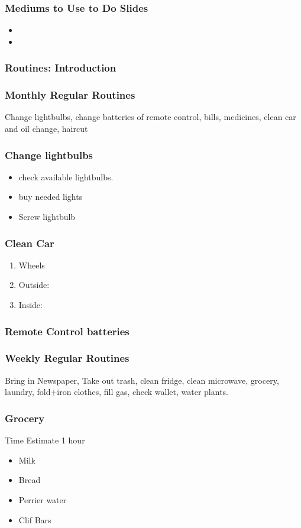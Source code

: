 \begin{frame} 
\frametitle{Mediums to Use to Do Slides}
\begin{itemize} 
\tiny \item \tiny  
\item \tiny 
\end{itemize} 
\end{frame}

\begin{frame}
\frametitle{Routines: Introduction}
\end{frame} 

\begin{frame}
\frametitle{Monthly Regular Routines  } 
{ \small Change lightbulbs, change batteries of remote control, bills,
  medicines, clean car and oil change, haircut}
\end{frame}

\begin{frame} 
\frametitle{Change lightbulbs}
\begin{itemize} 
\small \item \small check available lightbulbs.   
\item \small buy needed lights  
\item \small Screw lightbulb  
\end{itemize} 
\end{frame} 

\begin{frame} 
\frametitle{Clean Car} 
\begin{enumerate} 
\small \item \small Wheels  
\item \small Outside:  
\item \small Inside:  
\end{enumerate}  
\end{frame} 

\begin{frame} 
\frametitle{Remote Control batteries}  
\end{frame} 

\begin{frame}
\frametitle{Weekly Regular Routines }
{\small Bring in Newspaper, Take out trash, clean fridge, clean microwave,
grocery, laundry, fold+iron clothes, fill gas, check wallet, water plants.}
\end{frame}

\begin{frame}
\frametitle{Grocery} 
{\small Time Estimate 1 hour}  
\begin{itemize}
\tiny \item \tiny Milk 
\item \tiny Bread 
\item \tiny Perrier water
\item \tiny Clif Bars 
\end{itemize} 

\end{frame} 

